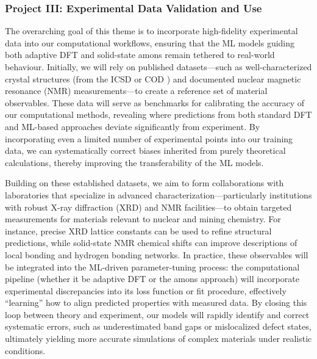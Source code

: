 \documentclass[11pt,letterpaper]{article}
\begin{document}
\subsubsection*{Project III: Experimental Data Validation and Use}  
The overarching goal of this theme is to incorporate high-fidelity experimental data into our computational workflows, ensuring that the ML models guiding both adaptive DFT and solid-state amons remain tethered to real-world behaviour. Initially, we will rely on published datasets—such as well-characterized crystal structures (from the ICSD \cite{levin2018nist} or COD \cite{COD,cod2}) and documented nuclear magnetic resonance (NMR) measurements—to create a reference set of material observables. These data will serve as benchmarks for calibrating the accuracy of our computational methods, revealing where predictions from both standard DFT and ML-based approaches deviate significantly from experiment. By incorporating even a limited number of experimental points into our training data, we can systematically correct biases inherited from purely theoretical calculations, thereby improving the transferability of the ML models.

Building on these established datasets, we aim to form collaborations with laboratories that specialize in advanced characterization—particularly institutions with robust X-ray diffraction (XRD) and NMR facilities—to obtain targeted measurements for materials relevant to nuclear and mining chemistry. For instance, precise XRD lattice constants can be used to refine structural predictions, while solid-state NMR chemical shifts can improve descriptions of local bonding and hydrogen bonding networks. In practice, these observables will be integrated into the ML-driven parameter-tuning process: the computational pipeline (whether it be adaptive DFT or the amons approach) will incorporate experimental discrepancies into its loss function or fit procedure, effectively “learning” how to align predicted properties with measured data. By closing this loop between theory and experiment, our models will rapidly identify and correct systematic errors, such as underestimated band gaps or mislocalized defect states, ultimately yielding more accurate simulations of complex materials under realistic conditions.


\newpage


 
\end{document}
